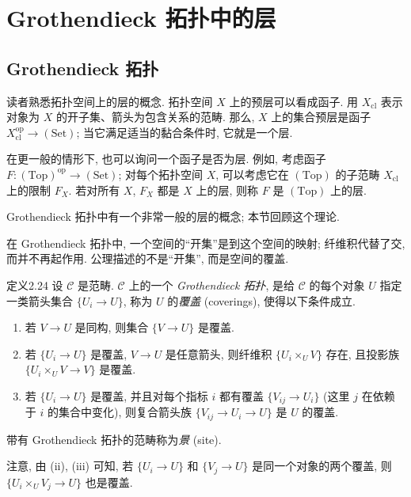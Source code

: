 \section{Grothendieck 拓扑中的层}\label{ch02:sec23}
\subsection{Grothendieck 拓扑}\label{ch02:sec231}
读者熟悉拓扑空间上的层的概念. 拓扑空间 $X$ 上的预层可以看成函子. 用 $X_{\mathrm{cl}}$ 表示对象为 $X$ 的开子集、箭头为包含关系的范畴. 那么, $X$ 上的集合预层是函子 $X_{\mathrm{cl}}^{\mathrm{op}}\to(\mathrm{Set})$; 当它满足适当的黏合条件时, 它就是一个层.

在更一般的情形下, 也可以询问一个函子是否为层. 例如, 考虑函子 $F:(\mathrm{Top})^{\mathrm{op}}\to(\mathrm{Set})$; 对每个拓扑空间 $X$, 可以考虑它在 $(\mathrm{Top})$ 的子范畴 $X_{\mathrm{cl}}$ 上的限制 $F_X$. 若对所有 $X$, $F_X$ 都是 $X$ 上的层, 则称 $F$ 是 $(\mathrm{Top})$ 上的层.

Grothendieck 拓扑中有一个非常一般的层的概念; 本节回顾这个理论.

在 Grothendieck 拓扑中, 一个空间的“开集”是到这个空间的映射; 纤维积代替了交, 而并不再起作用. 公理描述的不是“开集”, 而是空间的覆盖.

\begin{origstatement}{定义}{2.24}\label{ch02:def224}
设 $\mathcal C$ 是范畴. $\mathcal C$ 上的一个 \emph{Grothendieck 拓扑}, 是给 $\mathcal C$ 的每个对象 $U$ 指定一类箭头集合 $\{U_i\to U\}$, 称为 $U$ 的\emph{覆盖} (coverings), 使得以下条件成立.
\begin{enumerate}
\item[(i)] 若 $V\to U$ 是同构, 则集合 $\{V\to U\}$ 是覆盖.
\item[(ii)] 若 $\{U_i\to U\}$ 是覆盖, $V\to U$ 是任意箭头, 则纤维积 $\{U_i\times_UV\}$ 存在, 且投影族 $\{U_i\times_UV\to V\}$ 是覆盖.
\item[(iii)] 若 $\{U_i\to U\}$ 是覆盖, 并且对每个指标 $i$ 都有覆盖 $\{V_{ij}\to U_i\}$ (这里 $j$ 在依赖于 $i$ 的集合中变化), 则复合箭头族 $\{V_{ij}\to U_i\to U\}$ 是 $U$ 的覆盖.
\end{enumerate}
\end{origstatement}

带有 Grothendieck 拓扑的范畴称为\emph{景} (site).

注意, 由 (ii), (iii) 可知, 若 $\{U_i\to U\}$ 和 $\{V_j\to U\}$ 是同一个对象的两个覆盖, 则 $\{U_i\times_UV_j\to U\}$ 也是覆盖.

